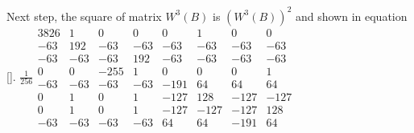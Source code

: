 \documentclass{article}
\begin{document}
Next step, the square of matrix $W^3(B)$ is $(W^3(B))^2$ and shown in equation \ref{}.
 $\frac{1}{256} 
\begin{array}{cccccccc}
3826 & 1 & 0 & 0 & 0 & 1 & 0 & 0 \\ 
-63 & 192 & -63 & -63 & -63 & -63 & -63 & -63 \\ 
-63 & -63 & -63 & 192 & -63 & -63 & -63 & -63 \\ 
0 & 0 & -255 & 1 & 0 & 0 & 0 & 1 \\ 
-63 & -63 & -63 & -63 & -191 & 64 & 64 & 64 \\ 
0 & 1 & 0 & 1 & -127 & 128 & -127 & -127 \\ 
0 & 1 & 0 & 1 & -127 & -127 & -127 & 128 \\ 
-63 & -63 & -63 & -63 & 64 & 64 & -191 & 64
\end{array}
$
\end{document}
